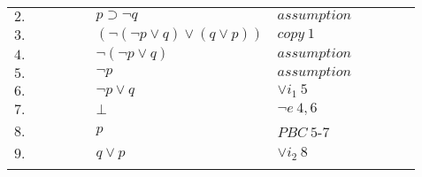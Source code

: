 \documentclass[12pt]{article}
\begin{document}
\begin{itemize}
\begin{table}[H]
\begin{tabular}{*{11}{l}}
			$2.$ & \multicolumn{1}{|c}{} & \multicolumn{1}{|c}{} & & & $p \supset \neg q$ & $assumption$ & & & \multicolumn{1}{c|}{} &\multicolumn{1}{c|}{}\\
			
			$3.$ & \multicolumn{1}{|c}{} & \multicolumn{1}{|c}{} & & & $(\neg (\neg p \lor q) \lor (q \lor p))$ & $copy \ 1$ & & & \multicolumn{1}{c|}{} &\multicolumn{1}{c|}{}\\
			
			\cline{4-9}
			
			$4.$ & \multicolumn{1}{|c}{} & \multicolumn{1}{|c}{} & \multicolumn{1}{|c}{} & & $\neg (\neg p \lor q)$ & $assumption$ & & \multicolumn{1}{c|}{} & \multicolumn{1}{c|}{} &\multicolumn{1}{c|}{}\\
			
			\cline{5-8}
			
			$5.$ & \multicolumn{1}{|c}{} & \multicolumn{1}{|c}{} & \multicolumn{1}{|c}{} & \multicolumn{1}{|c}{} & $\neg p$ & $assumption$ & \multicolumn{1}{c|}{} & \multicolumn{1}{c|}{} & \multicolumn{1}{c|}{} &\multicolumn{1}{c|}{}\\
			
			$6.$ & \multicolumn{1}{|c}{} & \multicolumn{1}{|c}{} & \multicolumn{1}{|c}{} & \multicolumn{1}{|c}{} & $\neg p \lor q$ & $\lor i_1 \ 5$ & \multicolumn{1}{c|}{} & \multicolumn{1}{c|}{} & \multicolumn{1}{c|}{} &\multicolumn{1}{c|}{}\\
			
			$7.$ & \multicolumn{1}{|c}{} & \multicolumn{1}{|c}{} & \multicolumn{1}{|c}{} & \multicolumn{1}{|c}{} & $\bot$ & $\neg e \ 4, 6$ & \multicolumn{1}{c|}{} & \multicolumn{1}{c|}{} & \multicolumn{1}{c|}{} &\multicolumn{1}{c|}{}\\
			
			\cline{5-8}
			
			$8.$ & \multicolumn{1}{|c}{} & \multicolumn{1}{|c}{} & \multicolumn{1}{|c}{} & & $p$ & $PBC \ 5$-$7$ & & \multicolumn{1}{c|}{} & \multicolumn{1}{c|}{} &\multicolumn{1}{c|}{}\\
			
			$9.$ & \multicolumn{1}{|c}{} & \multicolumn{1}{|c}{} & \multicolumn{1}{|c}{} & & $q \lor p$ & $\lor i_2 \ 8$ & & \multicolumn{1}{c|}{} & \multicolumn{1}{c|}{} &\multicolumn{1}{c|}{}\\
			
			\cline{4-9}
			
			
			\vspace{-12 pt}
			& \multicolumn{1}{|c}{} & \multicolumn{1}{|c}{} & & & & & & & \multicolumn{1}{c|}{} &\multicolumn{1}{c|}{}\\ \cline{4-9}
			

\end{tabular}
\end{table}
\end{itemize}
\end{document}
